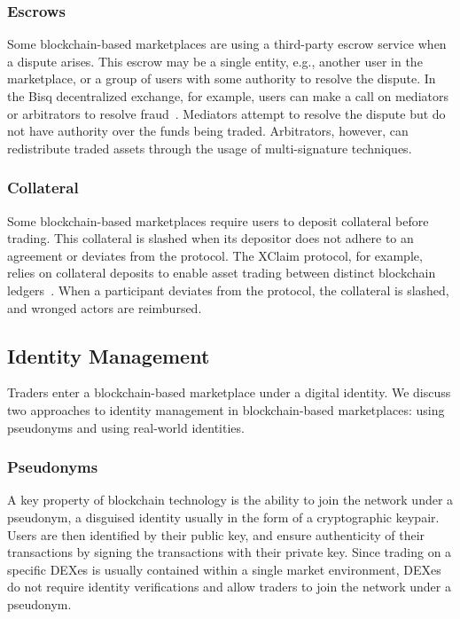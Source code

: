 \subsubsection{Escrows}
Some blockchain-based marketplaces are using a third-party escrow service when a dispute arises.
This escrow may be a single entity, e.g., another user in the marketplace, or a group of users with some authority to resolve the dispute.
In the Bisq decentralized exchange, for example, users can make a call on mediators or arbitrators to resolve fraud~\cite{bisq}.
Mediators attempt to resolve the dispute but do not have authority over the funds being traded.
Arbitrators, however, can redistribute traded assets through the usage of multi-signature techniques.

\subsubsection{Collateral}
Some blockchain-based marketplaces require users to deposit collateral before trading.
This collateral is slashed when its depositor does not adhere to an agreement or deviates from the protocol.
The XClaim protocol, for example, relies on collateral deposits to enable asset trading between distinct blockchain ledgers~\cite{zamyatin2019xclaim}.
When a participant deviates from the protocol, the collateral is slashed, and wronged actors are reimbursed.

\subsection{Identity Management}
Traders enter a blockchain-based marketplace under a digital identity.
We discuss two approaches to identity management in blockchain-based marketplaces: using pseudonyms and using real-world identities.

\subsubsection{Pseudonyms}
A key property of blockchain technology is the ability to join the network under a pseudonym, a disguised identity usually in the form of a cryptographic keypair.
Users are then identified by their public key, and ensure authenticity of their transactions by signing the transactions with their private key.
Since trading on a specific DEXes is usually contained within a single market environment, DEXes do not require identity verifications and allow traders to join the network under a pseudonym.

